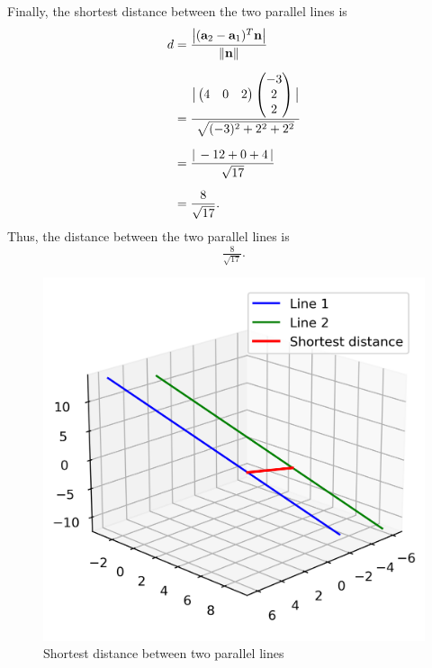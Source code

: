 \documentclass[12pt]{article}
\begin{document}
Finally, the shortest distance between the two parallel lines is
\begin{align}
    d &= \frac{\big| (\mathbf{a}_2 - \mathbf{a}_1)^T \mathbf{n} \big|}{\|\mathbf{n}\|} \\[6pt]
      &= \frac{\big| \begin{pmatrix}4 & 0 & 2\end{pmatrix} \begin{pmatrix}-3 \\ 2 \\ 2\end{pmatrix} \big|}{\sqrt{(-3)^2 + 2^2 + 2^2}} \\[6pt]
      &= \frac{|\, -12 + 0 + 4 \,|}{\sqrt{17}} \\[6pt]
      &= \frac{8}{\sqrt{17}}.
\end{align}
Thus, the distance between the two parallel lines is
\[
\boxed{\tfrac{8}{\sqrt{17}}}.
\]
\newpage
\begin{figure}[h]
    \centering
    \includegraphics[width=0.7\linewidth]{figures/shortest_distance.png}
    \caption{Shortest distance between two parallel lines}
    \label{fig:placeholder}
\end{figure}
\end{document}

